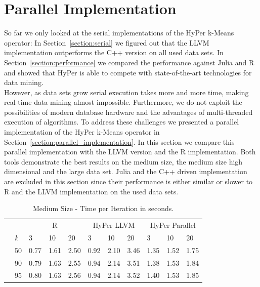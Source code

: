 \section{Parallel Implementation}\label{section:parallel}


So far we only looked at the serial implementations of the HyPer k-Means operator: In Section~\ref{section:serial}  we figured out that the LLVM implementation outperforms the C++ version on all used data sets. In Section~\ref{section:performance} we compared the performance against Julia and R and showed that HyPer is able to compete with state-of-the-art technologies for data mining.
\\
However, as data sets grow serial execution takes more and more time, making real-time data mining almost impossible. Furthermore, we do not exploit the possibilities of modern database hardware and the advantages of multi-threaded execution of algorithms. To address these challenges we presented a parallel implementation of the HyPer k-Means operator in Section~\ref{section:parallel_implementation}. In this section we compare this parallel implementation with the LLVM version and the R implementation. Both tools demonstrate the best results on the medium size, the medium size high dimensional and the large data set. Julia and the C++ driven implementation are excluded in this section since their performance is either similar or slower to R and the LLVM implementation on the used data sets.

\begin{table}[htsb]
  \caption[Medium Size - Time per Iteration]{Medium Size - Time per Iteration in seconds.}
  \label{tab:medium_final}
  \centering
  \begin{tabular}{l l l ll |l l l |l l l }
    \toprule
      && \multicolumn{3}{c}{R} & \multicolumn{3}{c}{HyPer LLVM} & \multicolumn{3}{c}{HyPer Parallel}  \\
      &\emph{k} & 3 & 10 & 20 & 3 & 10 & 20 & 3 & 10 & 20 \\
    \midrule
      \parbox[t]{2mm}{} &50  & 0.77 & 1.61 & 2.50 & 0.92 & 2.10 & 3.46 & 1.35 & 1.52 & 1.75 \\
      &90  & 0.79 & 1.63 & 2.55 & 0.94 & 2.14 & 3.51 & 1.38 & 1.53 & 1.84 \\
      &95  & 0.80 & 1.63 & 2.56 & 0.94 & 2.14 & 3.52 & 1.40 & 1.53 & 1.85 \\
    \bottomrule
  \end{tabular}
\end{table}

